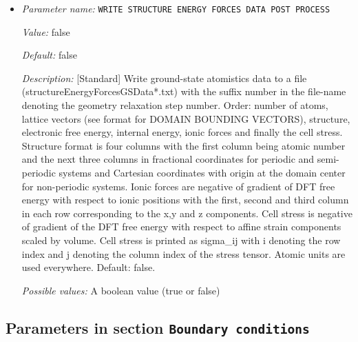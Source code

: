 \begin{itemize}
{\it Possible values:} An integer $n$ such that $-1\leq n \leq 5$
\item {\it Parameter name:} {\tt WRITE STRUCTURE ENERGY FORCES DATA POST PROCESS}
\label{parameters:WRITE STRUCTURE ENERGY FORCES DATA POST PROCESS}
\label{parameters:WRITE_20STRUCTURE_20ENERGY_20FORCES_20DATA_20POST_20PROCESS}


{\it Value:} false


{\it Default:} false


{\it Description:} [Standard] Write ground-state atomistics data to a file (structureEnergyForcesGSData*.txt) with the suffix number in the file-name denoting the geometry relaxation step number. Order: number of atoms, lattice vectors (see format for DOMAIN BOUNDING VECTORS), structure, electronic free energy, internal energy, ionic forces and finally the cell stress. Structure format is four columns with the first column being atomic number and the next three columns in fractional coordinates for periodic and semi-periodic systems and Cartesian coordinates with origin at the domain center for non-periodic systems. Ionic forces are negative of gradient of DFT free energy with respect to ionic positions with the first, second and third column in each row corresponding to the x,y and z components. Cell stress is negative of gradient of the DFT free energy with respect to affine strain components scaled by volume. Cell stress is printed as sigma_{ij} with i denoting the row index and j denoting the column index of the stress tensor. Atomic units are used everywhere. Default: false.


{\it Possible values:} A boolean value (true or false)
\end{itemize}



\subsection{Parameters in section \tt Boundary conditions}
\label{parameters:Boundary_20conditions}

